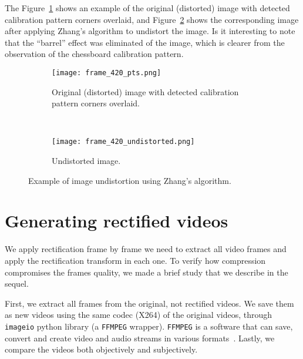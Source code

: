 The Figure~\ref{fig:undistort_1} shows an example of the original (distorted) image with detected calibration pattern corners overlaid,
and Figure~\ref{fig:undistort_2} shows the corresponding image after applying Zhang's algorithm to undistort the image.
Is it interesting to note that the ``barrel'' effect was eliminated of the image, which
is clearer from the observation of the chessboard calibration pattern.
%
\begin{figure}[th!]
  \centering
  \begin{subfigure}[t]{.8\linewidth}
    \centering
    \texttt{[image: frame\_420\_pts.png]}
    \caption{Original (distorted) image with detected calibration pattern corners overlaid.}
    \label{fig:undistort_1}
  \end{subfigure}\\
  \begin{subfigure}[t]{0.8\linewidth}
    \centering
    \texttt{[image: frame\_420\_undistorted.png]}
    \caption{Undistorted image.}
    \label{fig:undistort_2}
  \end{subfigure}
  \caption{Example of image undistortion using Zhang's algorithm.}
  \label{fig:undistort}
\end{figure}




  \section{Generating rectified videos}
  We apply rectification frame by frame \ie
  we need to extract all video frames and apply the rectification transform in each one.
  To verify how compression compromises the frames quality, we made a brief study that we describe in the sequel.

  First, we extract all frames from the original, not rectified videos.
  We save them as new videos using the same codec (X264) of the original videos, through
  \verb|imageio| python library (a \verb|FFMPEG| wrapper).
  \verb|FFMPEG| is a software that can save, convert and create video and audio streams in various formats~\cite{web:ffmpeg}.
  Lastly, we compare the videos both objectively and subjectively.


